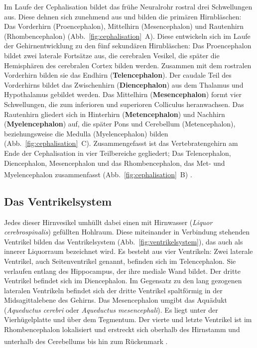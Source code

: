 \documentclass[12pt,a4paper,pdftex]{article}
\begin{document}
\noindent Im Laufe der Cephalisation bildet das frühe Neuralrohr rostral drei Schwellungen aus. Diese dehnen sich zunehmend aus und bilden die primären Hirnbläschen: Das Vorderhirn (Proencephalon), Mittelhirn (Mesencephalon) und Rautenhirn (Rhombencephalon) (Abb.~\ref{fig:cephalisation}~A). Diese entwickeln sich im Laufe der Gehirnentwicklung zu den fünf sekundären Hirnbläschen: Das Proencephalon bildet zwei laterale Fortsätze aus, die cerebralen Vesikel, die später die Hemisphären des cerebralen Cortex bilden werden. Zusammen mit dem rostralen Vorderhirn bilden sie das Endhirn (\textbf{Telencephalon}). Der caudale Teil des Vorderhirns bildet das Zwischenhirn (\textbf{Diencephalon}) aus dem Thalamus und Hypothalamus gebildet werden. Das Mittelhirn (\textbf{Mesencephalon}) formt vier Schwellungen, die zum inferioren und superioren Colliculus heranwachsen. Das Rautenhirn gliedert sich in Hinterhirn (\textbf{Metencephalon}) und Nachhirn (\textbf{Myelencephalon}) auf, die später Pons und Cerebellum (Metencephalon), beziehungsweise die Medulla (Myelencephalon) bilden (Abb.~\ref{fig:cephalisation}~C). Zusammengefasst ist das Vertebratengehirn am Ende der Cephalisation in vier Teilbereiche gegliedert; Das Telencephalon, Diencephalon, Mesencephalon und das Rhombencephalon, das Met- und Myelencephalon zusammenfasst (Abb.~\ref{fig:cephalisation}~B) \textsuperscript{\cite[10]{watson2010thebrain}}.

\subsection{Das Ventrikelsystem}
\label{subsec:} 

Jedes dieser Hirnvesikel umhüllt dabei einen mit Hirnwasser (\textit{Liquor cerebrospinalis}) gefüllten Hohlraum. Diese miteinander in Verbindung stehenden Ventrikel bilden das Ventrikelsystem (Abb.~\ref{fig:ventrikelsystem}), das auch als innerer Liquorraum  bezeichnet wird. Es besteht aus vier Ventrikeln: Zwei laterale Ventrikel, auch Seitenventrikel genannt, befinden sich im Telencephalon. Sie verlaufen entlang des Hippocampus, der ihre mediale Wand bildet. Der dritte Ventrikel befindet sich im Diencephalon. Im Gegensatz zu den lang gezogenen lateralen Ventrikeln befindet sich der dritte Ventrikel spaltförmig in der Midsagittalebene des Gehirns. Das Mesencephalon umgibt das Aquädukt (\textit{Aqueductus cerebri} oder \textit{Aqueductus mesencephali}). Es liegt unter der Vierhügelplatte und über dem Tegmentum. Der vierte und letzte Ventrikel ist im Rhombencephalon lokalisiert und erstreckt sich oberhalb des Hirnstamm und unterhalb des Cerebellums bis hin zum Rückenmark
\textsuperscript{\cite[2]{watson2010thebrain}}.
\end{document}
